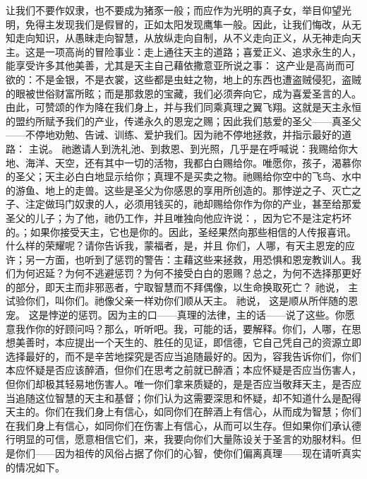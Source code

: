 让我们不要作奴隶，也不要成为猪豕一般；而应作为光明的真子女，举目仰望光明，免得主发现我们是假冒的，正如太阳发现鹰隼一般。因此，让我们悔改，从无知走向知识，从愚昧走向智慧，从放纵走向自制，从不义走向正义，从无神走向天主。这是一项高尚的冒险事业：走上通往天主的道路；喜爱正义、追求永生的人，能享受许多其他美善，尤其是天主自己藉依撒意亚所说之事：  这产业是高尚而可欲的：不是金银，不是衣裳，这些都是虫蛀之物，地上的东西也遭盗贼侵犯，盗贼的眼被世俗财富所眩；而是那救恩的宝藏，我们必须奔向它，成为喜爱圣言的人。由此，可赞颂的作为降在我们身上，并与我们同乘真理之翼飞翔。这就是天主永恒的盟约所赋予我们的产业，传递永久的恩宠之赐；因此我们慈爱的圣父——真圣父——不停地劝勉、告诫、训练、爱护我们。因为祂不停地拯救，并指示最好的道路： 主说。  祂邀请人到洗礼池、到救恩、到光照，几乎是在呼喊说：我赐给你大地、海洋、天空，还有其中一切的活物，我都白白赐给你。唯愿你，孩子，渴慕你的圣父；天主必白白地显示给你；真理不是买卖之物。祂赐给你空中的飞鸟、水中的游鱼、地上的走兽。这些是圣父为你感恩的享用所创造的。那悖逆之子、灭亡之子、注定做玛门奴隶的人，必须用钱买的，祂却赐给你作为你的产业，甚至给那爱圣父的儿子；为了他，祂仍工作，并且唯独向他应许说：，因为它不是注定朽坏的。；如果你接受天主，它也是你的。因此，圣经果然向那些相信的人传报喜讯。 什么样的荣耀呢？请你告诉我，蒙福者，是，并且 你们，人哪，有天主恩宠的应许；另一方面，也听到了惩罚的警告：主藉这些来拯救，用恐惧和恩宠教训人。我们为何迟延？为何不逃避惩罚？为何不接受白白的恩赐？总之，为何不选择那更好的部分，即天主而非邪恶者，宁取智慧而不拜偶像，以生命换取死亡？ 祂说，  主试验你们，叫你们。祂像父亲一样劝你们顺从天主。 祂说，  这是顺从所伴随的恩宠。 这是悖逆的惩罚。因为主的口——真理的法律，主的话——说了这些。你愿意我作你的好顾问吗？那么，听听吧。我，可能的话，要解释。你们，人哪，在思想美善时，本应提出一个天生的、胜任的见证，即信德，它自己凭自己的资源立即选择最好的，而不是辛苦地探究是否应当追随最好的。因为，容我告诉你们，你们本应怀疑是否应该醉酒，但你们在思考之前就已醉酒；本应怀疑是否应当伤害人，但你们却极其轻易地伤害人。唯一你们拿来质疑的，是是否应当敬拜天主，是否应当追随这位智慧的天主和基督；你们认为这需要深思和怀疑，却不知道什么是配得天主的。你们在我们身上有信心，如同你们在醉酒上有信心，从而成为智慧；你们在我们身上有信心，如同你们在伤害上有信心，从而可以生存。但如果你们承认德行明显的可信，愿意相信它们，来，我要向你们大量陈设关于圣言的劝服材料。但是你们——因为祖传的风俗占据了你们的心智，使你们偏离真理——现在请听真实的情况如下。\par

